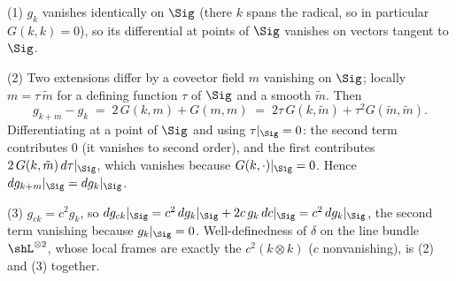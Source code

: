 (1) $g_k$ vanishes identically on $\Sig$ (there $k$ spans the radical, so in particular $G(k,k) = 0$), so its differential at points of $\Sig$ vanishes on vectors tangent to $\Sig$.

(2) Two extensions differ by a covector field $m$ vanishing on $\Sig$; locally $m = \tau\, \tilde m$ for a defining function $\tau$ of $\Sig$ and a smooth $\tilde m$. Then
\[
g_{k + m} - g_k \;=\; 2\,G(k, m) + G(m,m) \;=\; 2\tau\, G(k, \tilde m) + \tau^2 G(\tilde m, \tilde m).
\]
Differentiating at a point of $\Sig$ and using $\tau|_\Sig = 0$: the second term contributes $0$ (it vanishes to second order), and the first contributes $2\,G(k, \tilde m)\, d\tau|_\Sig$, which vanishes because $G(k, \cdot)|_\Sig = 0$. Hence $dg_{k+m}|_\Sig = dg_k|_\Sig$.

(3) $g_{ck} = c^2 g_k$, so $dg_{ck}|_\Sig = c^2\, dg_k|_\Sig + 2c\,g_k\,dc|_\Sig = c^2\, dg_k|_\Sig$, the second term vanishing because $g_k|_\Sig = 0$. Well-definedness of $\delta$ on the line bundle $\shL^{\otimes 2}$, whose local frames are exactly the $c^2 (k \otimes k)$ ($c$ nonvanishing), is (2) and (3) together.

